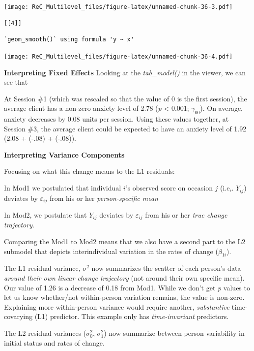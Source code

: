 \documentclass[
  english,
]{book}
\begin{document}
\texttt{[image: ReC\_Multilevel\_files/figure-latex/unnamed-chunk-36-3.pdf]}

\begin{verbatim}
[[4]]
\end{verbatim}

\begin{verbatim}
`geom_smooth()` using formula 'y ~ x'
\end{verbatim}

\texttt{[image: ReC\_Multilevel\_files/figure-latex/unnamed-chunk-36-4.pdf]}

\textbf{Interpreting Fixed Effects}
Looking at the \emph{tab\_model()} in the viewer, we can see that

At Session \#1 (which was rescaled so that the value of 0 is the first session), the average client has a non-zero anxiety level of 2.78 (\emph{p} \textless{} 0.001; \(\gamma _{00}\)). On average, anxiety decreases by 0.08 units per session. Using these values together, at Session \#3, the average client could be expected to have an anxiety level of 1.92 (2.08 + (-.08) + (-.08)).

\textbf{Interpreting Variance Components}

Focusing on what this change means to the L1 residuals:

In Mod1 we postulated that individual \(i\)'s observed score on occasion \(j\) (i.e,. \(Y_{ij}\)) deviates by \(\varepsilon _{ij}\) from his or her \emph{person-specific mean}

In Mod2, we postulate that \(Y_{ij}\) deviates by \(\varepsilon _{ij}\) from his or her \emph{true change trajectory}.

Comparing the Mod1 to Mod2 means that we also have a second part to the L2 submodel that depicts interindividual variation in the rates of change (\(\beta _{1i}\)).

The L1 residual variance, \(\sigma^{2}\) now summarizes the scatter of each person's data \emph{around their own linear change trajectory} (not around their own specific mean). Our value of 1.26 is a decrease of 0.18 from Mod1. While we don't get \emph{p} values to let us know whether/not within-person variation remains, the value is non-zero. Explaining more within-person variance would require another, \emph{substantive} time-covarying (L1) predictor. This example only has \emph{time-invariant} predictors.

The L2 residual variances (\(\sigma_{0 }^{2}\), \(\sigma_{1 }^{2}\)) now summarize between-person variability in initial status and rates of change.
\end{document}
